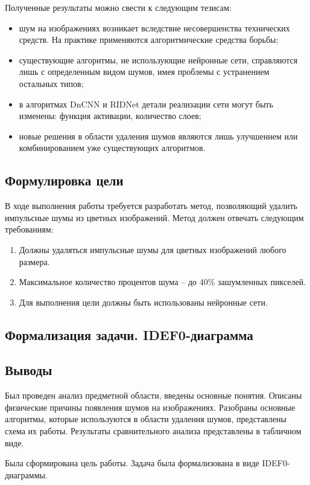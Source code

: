 Полученные результаты можно свести к следующим тезисам:
\begin{itemize}
	\item шум на изображениях возникает вследствие несовершенства технических средств. На практике применяются алгоритмические средства борьбы;
	\item существующие алгоритмы, не использующие нейронные сети, справляются лишь с определенным видом шумов, имея проблемы с устранением остальных типов;
	\item в алгоритмах DnCNN и RIDNet детали реализации сети могут быть изменены: функция активации, количество слоев;
	\item новые решения в области удаления шумов являются лишь улучшением или комбинированием уже существующих алгоритмов.
\end{itemize}

\subsection{Формулировка цели}
В ходе выполнения работы требуется разработать метод, позволяющий удалить импульсные шумы из цветных изображений. 
Метод должен отвечать следующим требованиям:
\begin{enumerate}
	\item Должны удаляться импульсные шумы для цветных изображений любого размера.
	\item Максимальное количество процентов шума -- до 40\% зашумленных пикселей.
	\item Для выполнения цели должны быть использованы нейронные сети.
\end{enumerate}

\subsection{Формализация задачи. IDEF0-диаграмма}

\subsection*{Выводы}
Был проведен анализ предметной области, введены основные понятия.
Описаны физические причины появления шумов на изображениях.
Разобраны основные алгоритмы, которые используются в области удаления шумов, представлены схема их работы.
Результаты сравнительного анализа представлены в табличном виде.

Была сформирована цель работы.
Задача была формализована в виде IDEF0-диаграммы.